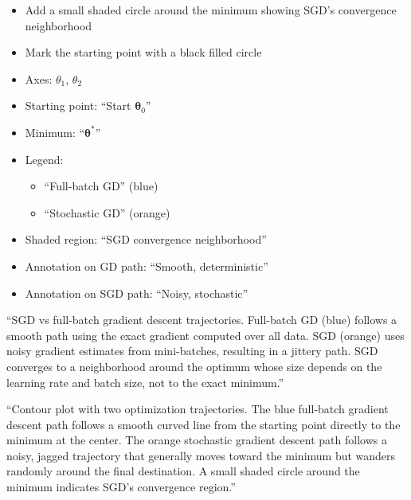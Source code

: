\documentclass[12pt]{article}
\begin{document}
\begin{description}[style=nextline, leftmargin=0pt]
\begin{itemize}
        \item Add a small shaded circle around the minimum showing SGD's convergence neighborhood
        \item Mark the starting point with a black filled circle
    \end{itemize}

    \item[Required Labels]
    \begin{itemize}
        \item Axes: $\theta_1$, $\theta_2$
        \item Starting point: ``Start $\boldsymbol{\theta}_0$''
        \item Minimum: ``$\boldsymbol{\theta}^*$''
        \item Legend:
        \begin{itemize}
            \item ``Full-batch GD'' (blue)
            \item ``Stochastic GD'' (orange)
        \end{itemize}
        \item Shaded region: ``SGD convergence neighborhood''
        \item Annotation on GD path: ``Smooth, deterministic''
        \item Annotation on SGD path: ``Noisy, stochastic''
    \end{itemize}

    \item[Caption Text]
    ``SGD vs full-batch gradient descent trajectories. Full-batch GD (blue) follows a smooth path using the exact gradient computed over all data. SGD (orange) uses noisy gradient estimates from mini-batches, resulting in a jittery path. SGD converges to a neighborhood around the optimum whose size depends on the learning rate and batch size, not to the exact minimum.''

    \item[Alt-Text for Accessibility]
    ``Contour plot with two optimization trajectories. The blue full-batch gradient descent path follows a smooth curved line from the starting point directly to the minimum at the center. The orange stochastic gradient descent path follows a noisy, jagged trajectory that generally moves toward the minimum but wanders randomly around the final destination. A small shaded circle around the minimum indicates SGD's convergence region.''
\end{description}
\end{document}
